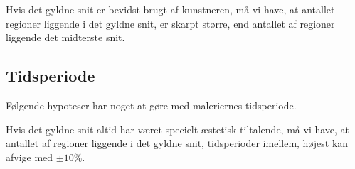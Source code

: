 {\begin{hypotese}
    Hvis det gyldne snit er bevidst brugt af kunstneren, må vi have, at
    antallet regioner liggende i det gyldne snit, er skarpt større, end
    antallet af regioner liggende det midterste snit.
\end{hypotese}

\subsection{Tidsperiode}
Følgende hypoteser har noget at gøre med maleriernes tidsperiode.

\begin{hypotese}
    Hvis det gyldne snit altid har været specielt æstetisk tiltalende,
    må vi have, at antallet af regioner liggende i det gyldne snit,
    tidsperioder imellem, højest kan afvige med $\pm10\%$.
\end{hypotese}

}
